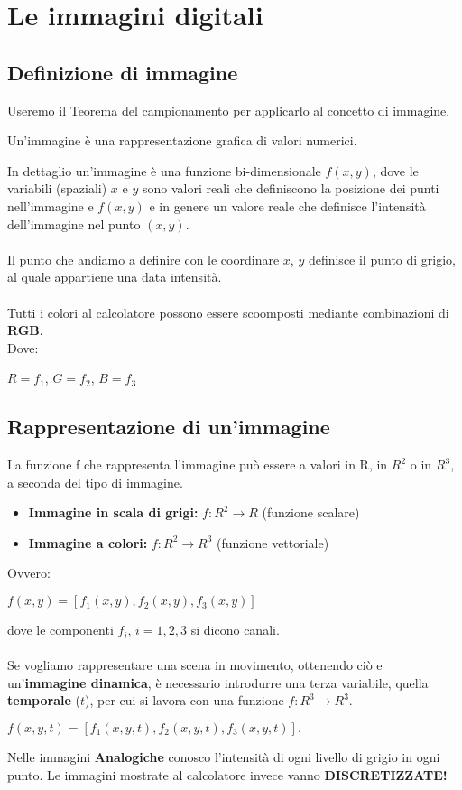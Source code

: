 \chapter{Le immagini digitali}
\section{Definizione di immagine}
Useremo il Teorema del campionamento per applicarlo al concetto di immagine.
\begin{definition}
    Un’immagine è una rappresentazione grafica di valori numerici.
\end{definition}
In dettaglio un’immagine è una funzione bi-dimensionale $f(x,y)$, dove le variabili (spaziali) $x$ e $y$ sono valori reali che definiscono la posizione dei punti nell’immagine e $f(x,y)$ e in genere un valore reale che definisce l’intensità dell’immagine nel punto $(x,y)$.
\\\\Il punto che andiamo a definire con le coordinare $x$, $y$ definisce il punto di grigio, al quale appartiene una data intensità.
\\\\Tutti i colori al calcolatore possono essere scoomposti mediante combinazioni di \textbf{RGB}.
\\Dove:
\begin{center}
    $R = f_1$, $G = f_2$, $B = f_3$
\end{center}
\section{Rappresentazione di un’immagine}
La funzione f che rappresenta l’immagine può essere a valori in R,
in $R^2$ o in $R^3$, a seconda del tipo di immagine.
\begin{itemize}
    \item \textbf{Immagine in scala di grigi:} $f:R^2 \rightarrow R$ (funzione scalare)
    \item \textbf{Immagine a colori:} $f:R^2 \rightarrow R^3$ (funzione vettoriale)
\end{itemize}
Ovvero:
\begin{center}
    $f(x,y) = [f_1(x,y), f_2(x,y), f_3(x,y)]$
\end{center}
dove le componenti $f_i$, $i = 1,2,3$ si dicono canali.
\\\\Se vogliamo rappresentare una scena in movimento, ottenendo
ciò e un’\textbf{immagine dinamica}, è necessario introdurre una terza
variabile, quella \textbf{temporale} ($t$), per cui si lavora con una funzione
$f: R^3 \rightarrow R^3$.
\begin{center}
    $f(x,y,t) = [f_1(x,y,t), f_2(x ,y,t), f_3(x,y,t)].$
\end{center}
Nelle immagini \textbf{Analogiche} conosco l'intensità di ogni livello di grigio in ogni punto.
Le immagini mostrate al calcolatore invece vanno \textbf{DISCRETIZZATE!}
